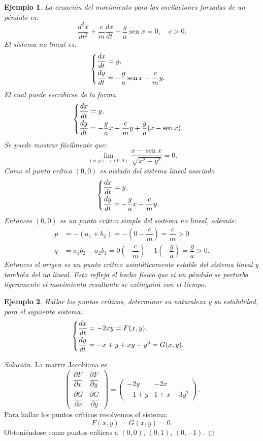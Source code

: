 \documentclass[a5paper,doc,10pt,noapacite]{apa6}
\DeclareMathOperator{\sen}{sen}
\newtheorem{ejem}{Ejemplo}
\begin{document}
{{\begin{ejem}
	La ecuación del movimiento para las oscilaciones forzadas de un péndulo es:
	\[
	\dfrac{d^2x}{dt^2}+\dfrac{c}{m}\dfrac{dx}{dt}+\dfrac{g}{a}\sen x=0,\quad c>0.
	\]
	El sistema no lineal es:
	\[
	\begin{cases}
		\dfrac{dx}{dt}=y ,	\vspace{0.3em}
		\\
		\dfrac{dy}{dt}=-\dfrac{g}{a}\sen x-\dfrac{c}{m}y.
	\end{cases}
	\]
	El cual puede escribirse de la forma
	\[
	\begin{cases}
		\dfrac{dx}{dt}=y ,	\vspace{0.3em}
		\\
		\dfrac{dy}{dt}=-\dfrac{g}{a}x-\dfrac{c}{m}y+\dfrac{g}{a}(x-\sen x).
	\end{cases}
	\]
	Se puede mostrar fácilmente que:
	\[
	\lim_{(x,y)\to(0,0)}\dfrac{x-\sen x}{\sqrt{x^2+y^2}}=0.
	\]
	Como el punto crítico \((0,0)\) es aislado del sistema lineal asociado
	\[
	\begin{cases}
		\dfrac{dx}{dt}=y ,	\vspace{0.3em}
		\\
		\dfrac{dy}{dt}=-\dfrac{g}{a}x-\dfrac{c}{m}y.
	\end{cases}
	\]
	Entonces \((0,0)\) es un punto crítico simple del sistema no lineal, además:
	\begin{align*}
		p&=-(a_1+b_2)=-\left(0-\dfrac{c}{m}\right)=\dfrac{c}{m}>0\\
		q&=a_1b_2-a_2b_1=0\left(-\dfrac{c}{m}\right)-1\left(-\dfrac{g}{a}\right)=\dfrac{g}{a}>0.
	\end{align*}
	Entonces el origen es un punto crítico asintóticamente estable del sistema lineal y también del no lineal. Esto refleja el hecho físico que si un péndulo se perturba ligeramente el movimiento resultante se extinguirá con el tiempo.
\end{ejem}


\begin{ejem}
	Hallar los puntos críticos, determinar su naturaleza y su estabilidad, para el siguiente sistema:
	\[
	\begin{cases}
		\dfrac{dx}{dt}=-2xy=F(x,y) ,	\vspace{0.3em}
		\\
		\dfrac{dy}{dt}=-x+y+xy-y^3=G(x,y).
	\end{cases}
	\]
\end{ejem}
\begin{proof}[Solución]
	La matriz Jacobiana es
	\[
	\begin{pmatrix} \dfrac{\partial F}{\partial x} & \dfrac{\partial F}{\partial y} \\ \dfrac{\partial G}{\partial x} & \dfrac{\partial G}{\partial y} \end{pmatrix}=\begin{pmatrix} -2y & -2x \\ -1+y & 1+x-3y^2 \end{pmatrix}.
	\]
	Para hallar los puntos críticos resolvemos el sistema:
	\[
	F(x,y)=G(x,y)=0.
	\]
	Obteniéndose como puntos críticos a \((0,0)\), \((0,1)\), \((0,-1)\).
	

\end{proof}}}
\end{document}
